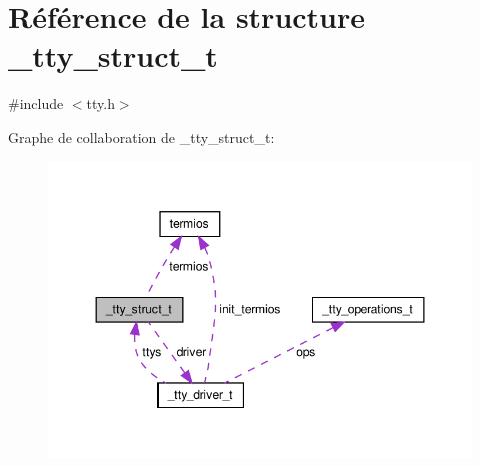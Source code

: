 \hypertarget{struct__tty__struct__t}{\section{Référence de la structure \-\_\-tty\-\_\-struct\-\_\-t}
\label{struct__tty__struct__t}
}


{\ttfamily \#include $<$tty.\-h$>$}



Graphe de collaboration de \-\_\-tty\-\_\-struct\-\_\-t\-:\nopagebreak
\begin{figure}[H]
\begin{center}
\leavevmode
\includegraphics[width=347pt]{struct__tty__struct__t__coll__graph}
\end{center}
\end{figure}
